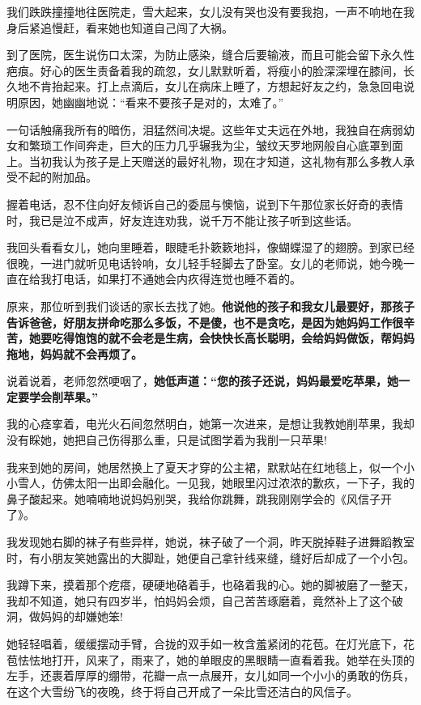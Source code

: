 \documentclass[UTF8,a4paper,8pt]{ctexbook}
\begin{document}
		我们跌跌撞撞地往医院走，雪大起来，女儿没有哭也没有要我抱，一声不响地在我身后紧追慢赶，看来她也知道自己闯了大祸。
		
		到了医院，医生说伤口太深，为防止感染，缝合后要输液，而且可能会留下永久性疤痕。好心的医生责备着我的疏忽，女儿默默听着，将瘦小的脸深深埋在膝间，长久地不肯抬起来。打上点滴后，女儿在病床上睡了，方想起好友之约，急急回电说明原因，她幽幽地说：“看来不要孩子是对的，太难了。”
		
		一句话触痛我所有的暗伤，泪猛然间决堤。这些年丈夫远在外地，我独自在病弱幼女和繁琐工作间奔走，巨大的压力几乎辗我为尘，皱纹天罗地网般自心底罩到面上。当初我认为孩子是上天赠送的最好礼物，现在才知道，这礼物有那么多教人承受不起的附加品。
		
		握着电话，忍不住向好友倾诉自己的委屈与懊恼，说到下午那位家长好奇的表情时，我已是泣不成声，好友连连劝我，说千万不能让孩子听到这些话。
		
		我回头看看女儿，她向里睡着，眼睫毛扑簌簌地抖，像蝴蝶湿了的翅膀。到家已经很晚，一进门就听见电话铃响，女儿轻手轻脚去了卧室。女儿的老师说，她今晚一直在给我打电话，如果打不通她会内疚得连觉也睡不着的。
		
		原来，那位听到我们谈话的家长去找了她。\textbf{他说他的孩子和我女儿最要好，那孩子告诉爸爸，好朋友拼命吃那么多饭，不是傻，也不是贪吃，是因为她妈妈工作很辛苦，她要吃得饱饱的就不会老是生病，会快快长高长聪明，会给妈妈做饭，帮妈妈拖地，妈妈就不会再烦了。}
		
		说着说着，老师忽然哽咽了，\textbf{她低声道：“您的孩子还说，妈妈最爱吃苹果，她一定要学会削苹果。”}
		
		我的心痉挛着，电光火石间忽然明白，她第一次进来，是想让我教她削苹果，我却没有睬她，她把自己伤得那么重，只是试图学着为我削一只苹果!
		
		我来到她的房间，她居然换上了夏天才穿的公主裙，默默站在红地毯上，似一个小小雪人，仿佛太阳一出即会融化。一见我，她眼里闪过浓浓的歉疚，一下子，我的鼻子酸起来。她喃喃地说妈妈别哭，我给你跳舞，跳我刚刚学会的《风信子开了》。
		
		我发现她右脚的袜子有些异样，她说，袜子破了一个洞，昨天脱掉鞋子进舞蹈教室时，有小朋友笑她露出的大脚趾，她便自己拿针线来缝，缝好后却成了一个小包。
		
		我蹲下来，摸着那个疙瘩，硬硬地硌着手，也硌着我的心。她的脚被磨了一整天，我却不知道，她只有四岁半，怕妈妈会烦，自己苦苦琢磨着，竟然补上了这个破洞，做妈妈的却嫌她笨!
		
		她轻轻唱着，缓缓摆动手臂，合拢的双手如一枚含羞紧闭的花苞。在灯光底下，花苞怯怯地打开，风来了，雨来了，她的单眼皮的黑眼睛一直看着我。她举在头顶的左手，还裹着厚厚的绷带，花瓣一点一点展开，女儿如同一个小小的勇敢的伤兵，在这个大雪纷飞的夜晚，终于将自己开成了一朵比雪还洁白的风信子。
		
\end{document}
